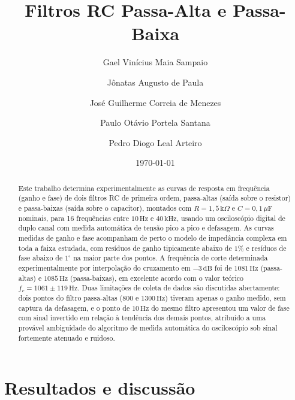 \documentclass[reprint,amsmath,amssymb,aps,prl,floatfix,onecolumn]{revtex4-2}
\begin{document}


\title{Filtros RC Passa-Alta e Passa-Baixa}

\author{Gael Vinícius Maia Sampaio}
\author{Jônatas Augusto de Paula}
\author{José Guilherme Correia de Menezes}
\author{Paulo Otávio Portela Santana}
\author{Pedro Diogo Leal Arteiro}

\date{\today}

\begin{abstract}
Este trabalho determina experimentalmente as curvas de resposta em frequência (ganho e fase) de dois filtros RC de primeira ordem, passa-altas (saída sobre o resistor) e passa-baixas (saída sobre o capacitor), montados com $R=1{,}5\,\text{k}\Omega$ e $C=0{,}1\,\mu\text{F}$ nominais, para 16 frequências entre $10\,\text{Hz}$ e $40\,\text{kHz}$, usando um osciloscópio digital de duplo canal com medida automática de tensão pico a pico e defasagem. As curvas medidas de ganho e fase acompanham de perto o modelo de impedância complexa em toda a faixa estudada, com resíduos de ganho tipicamente abaixo de $1\%$ e resíduos de fase abaixo de $1^\circ$ na maior parte dos pontos. A frequência de corte determinada experimentalmente por interpolação do cruzamento em $-3\,\text{dB}$ foi de $1081\,\text{Hz}$ (passa-altas) e $1085\,\text{Hz}$ (passa-baixas), em excelente acordo com o valor teórico $f_c=1061\pm119\,\text{Hz}$. Duas limitações de coleta de dados são discutidas abertamente: dois pontos do filtro passa-altas ($800$ e $1300\,\text{Hz}$) tiveram apenas o ganho medido, sem captura da defasagem, e o ponto de $10\,\text{Hz}$ do mesmo filtro apresentou um valor de fase com sinal invertido em relação à tendência dos demais pontos, atribuído a uma provável ambiguidade do algoritmo de medida automática do osciloscópio sob sinal fortemente atenuado e ruidoso.
\end{abstract}

\maketitle

\section{Resultados e discussão}
\end{document}
